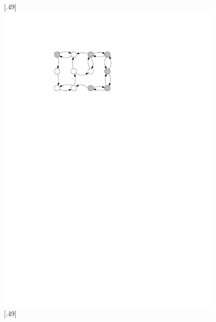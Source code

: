 \begin{figure}
\centering
{}[.49\linewidth]
{\includegraphics{figures/G_1.pdf}}
[.49\linewidth]

\end{figure}
